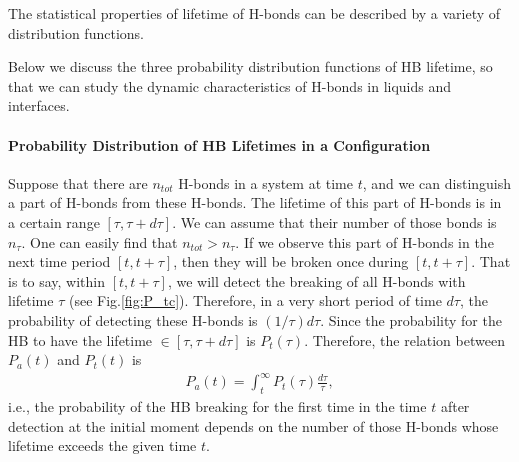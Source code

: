 The statistical properties of lifetime of H-bonds can be described by a variety of distribution functions.{\cite{Rapaport1983, Tanaka1983, Geiger1984,Naberukhin2009}
Below we discuss the three probability distribution functions of HB lifetime, so that we can study the dynamic characteristics of H-bonds in liquids and interfaces.
\paragraph{Probability Distribution of HB Lifetimes in a Configuration}\label{P_tc}
Suppose that there are $n_{tot}$ H-bonds in a system at time $t$, and we can distinguish a part of H-bonds from these H-bonds. 
The lifetime of this part of H-bonds is in a certain range $[\tau, \tau + d\tau]$. We can assume that their number of those bonds is $n_\tau$. 
One can easily find that $n_{tot}>n_\tau$. If we observe this part of H-bonds in the next time period $[t, t+\tau]$, 
then they will be broken once during $[t, t+\tau]$. 
That is to say, within $[t,t+\tau]$, we will detect the breaking of all H-bonds with lifetime $\tau$ (see Fig.\thinspace\ref{fig:P_tc}).  
Therefore, in a very short period of time $d\tau$, the probability of detecting these H-bonds is $(1/\tau)d\tau$.
Since the probability for the HB to have the lifetime $\in [\tau,\tau+d\tau]$ is $P_t(\tau)$. 
Therefore, the relation between $P_a(t)$ and $P_t(t)$ is
\begin{eqnarray}
P_a(t) = \int_t^\infty P_t(\tau)\frac{d\tau}{\tau},
\label{eq:Pt_and_P}
\end{eqnarray}
i.e., the probability of the HB breaking for the first time in the time $t$ after detection at the initial moment depends on 
the number of those H-bonds whose lifetime exceeds the given time $t$. \cite{Voloshin2009}
\begin{figure}
\centering
{}
\end{figure}}
